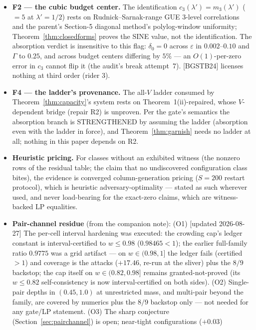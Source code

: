 \documentclass[11pt]{article}
\theoremstyle{plain}
\theoremstyle{definition}
\theoremstyle{remark}
\begin{document}
\begin{itemize}
\item \textbf{F2 --- the cubic budget center.} The identification
  $c_3(\lambda') = m_3(\lambda')$ ($= 5$ at $\lambda' = 1/2$) rests on
  Rudnick--Sarnak-range GUE $3$-level correlations and the parent's Section-5
  diagonal method's polylog-window uniformity;
  Theorem~\ref{thm:closedforms} proves the SINE value, not the identification.
  The absorption verdict is insensitive to this flag: $\delta_0 = 0$ across
  $\varepsilon$ in $0.002$--$0.10$ and $\Gamma$ to $0.25$, and across budget
  centers differing by $5\%$ --- an $O(1)$-per-zero error in $c_3$ cannot flip it
  (the audit's break attempt~7). [BGSTB24] licenses nothing at third order (rider
  3).
\item \textbf{F4 --- the ladder's provenance.} The all-$V$ ladder consumed by
  Theorem~\ref{thm:capacity}'s system rests on Theorem~1(ii)-repaired, whose
  $V$-dependent bridge (repair R2) is unproven. Per the gate's semantics the
  absorption branch is STRENGTHENED by assuming the ladder (absorption even with
  the ladder in force), and Theorem~\ref{thm:garnish} needs no ladder at all;
  nothing in this paper depends on R2.
\item \textbf{Heuristic pricing.} For classes without an exhibited witness (the
  nonzero rows of the residual table; the claim that no undiscovered
  configuration class bites), the evidence is converged column-generation pricing
  ($S = 200$ restart protocol), which is heuristic adversary-optimality --- stated
  as such wherever used, and never load-bearing for the exact-zero claims, which
  are witness-backed LP equalities.
\item \textbf{Pair-channel residue} (from the companion note): (O1) [updated
  2026-08-27] The per-cell interval hardening was executed: the crowding cap's
  ledger constant is interval-certified to $w \le 0.98$ ($0.98465 < 1$); the
  earlier full-family ratio $0.9775$ was a grid artifact --- on
  $w \in (0.98, 1]$ the ledger fails (certified $> 1$) and coverage is the
  attacks ($+17.46$, re-run at the sliver) plus the $8/9$ backstop; the cap itself
  on $w \in (0.82, 0.98]$ remains granted-not-proved (its $w \le 0.82$
  self-consistency is now interval-certified on both sides). (O2) Single-pair
  depths in $(0.45, 1.0)$ at unrestricted mass, and multi-pair beyond the family,
  are covered by numerics plus the $8/9$ backstop only --- not needed for any
  gate/LP statement. (O3) The sharp conjecture
  (Section~\ref{sec:pairchannel}) is open; near-tight configurations ($+0.03$)

\end{itemize}
\end{document}
